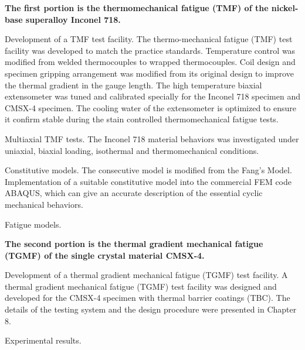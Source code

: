 \textbf{The first portion is the thermomechanical fatigue (TMF) of the nickel-base superalloy Inconel 718.}
\begin{list}{.}
  {
  \setlength{\rightmargin}{\leftmargin}}
    \item Development of a TMF test facility. The thermo-mechanical fatigue (TMF) test facility was developed to match the practice standards.
        Temperature control was modified from welded thermocouples to wrapped thermocouples.
        Coil design and specimen gripping arrangement was modified from its original design to improve the thermal gradient in the gauge length.
        The high temperature biaxial extensometer was tuned and calibrated specially for the Inconel 718 specimen and CMSX-4 specimen.
        The cooling water of the extensometer is optimized to ensure it confirm stable during the stain controlled thermomechanical fatigue tests.
    \item Multiaxial TMF tests. The Inconel 718 material behaviors was investigated under uniaxial, biaxial loading, isothermal and thermomechanical conditions.
    \item Constitutive models. The consecutive model is modified from the Fang's Model.
        Implementation of a suitable constitutive model into the commercial FEM code ABAQUS, which can give an accurate description of the essential cyclic mechanical behaviors.
    \item Fatigue models.
\end{list}

\textbf{The second portion is the thermal gradient mechanical fatigue (TGMF) of the single crystal material CMSX-4.}

\begin{list}{.}
  {
  \setlength{\rightmargin}{\leftmargin}}
    \item Development of a thermal gradient mechanical fatigue (TGMF) test facility. A thermal gradient mechanical fatigue (TGMF) test facility was designed and developed for the CMSX-4 specimen with thermal barrier coatings (TBC).
        The details of the testing system and the design procedure were presented in Chapter 8.
    \item Experimental results.
\end{list} 